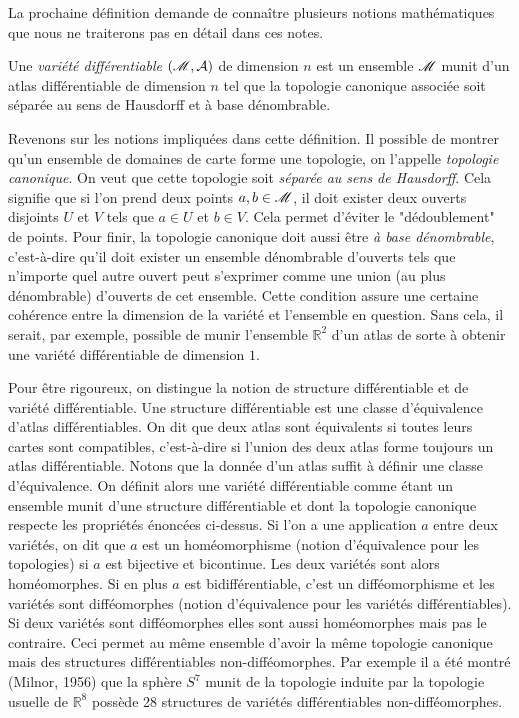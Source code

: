 \documentclass[a4paper,11pt]{report}
\begin{document}
            La prochaine définition demande de connaître plusieurs notions mathématiques que nous ne traiterons pas en détail dans ces notes.
            
            \begin{defn}
                Une \textit{variété différentiable} $(\mathscr{M},\mathcal{A})$ de dimension $n$ est un ensemble $\mathscr{M}$ munit d'un atlas différentiable de dimension $n$ tel que la topologie canonique associée soit séparée au sens de Hausdorff et à base dénombrable.
            \end{defn}
            
            Revenons sur les notions impliquées dans cette définition. Il possible de montrer qu'un ensemble de domaines de carte forme une topologie, on l'appelle \textit{topologie canonique}. On veut que cette topologie soit \textit{séparée au sens de Hausdorff}. Cela signifie que si l'on prend deux points $a, b \in \mathscr{M}$, il doit exister deux ouverts disjoints $U$ et $V$ tels que $a \in U$ et $b \in V$. Cela permet d'éviter le "dédoublement" de points. Pour finir, la topologie canonique doit aussi être \textit{à base dénombrable}, c'est-à-dire qu'il doit exister un ensemble dénombrable d'ouverts tels que n'importe quel autre ouvert peut s'exprimer comme une union (au plus dénombrable) d'ouverts de cet ensemble. Cette condition assure une certaine cohérence entre la dimension de la variété et l'ensemble en question. Sans cela, il serait, par exemple, possible de munir l'ensemble $\mathbb{R}^2$ d'un atlas de sorte à obtenir une variété différentiable de dimension $1$.
            
            \begin{rmk}
                Pour être rigoureux, on distingue la notion de structure différentiable et de variété différentiable. Une structure différentiable est une classe d'équivalence d'atlas différentiables. On dit que deux atlas sont équivalents si toutes leurs cartes sont compatibles, c'est-à-dire si l'union des deux atlas forme toujours un atlas différentiable. Notons que la donnée d'un atlas suffit à définir une classe d'équivalence. On définit alors une variété différentiable comme étant un ensemble munit d'une structure différentiable et dont la topologie canonique respecte les propriétés énoncées ci-dessus. Si l'on a une application $a$ entre deux variétés, on dit que $a$ est un homéomorphisme (notion d'équivalence pour les topologies) si $a$ est bijective et bicontinue. Les deux variétés sont alors homéomorphes. Si en plus $a$ est bidifférentiable, c'est un difféomorphisme et les variétés sont difféomorphes (notion d'équivalence pour les variétés différentiables). Si deux variétés sont difféomorphes elles sont aussi homéomorphes mais pas le contraire. Ceci permet au même ensemble d'avoir la même topologie canonique mais des structures différentiables non-difféomorphes. Par exemple il a été montré (Milnor, 1956) que la sphère $S^7$ munit de la topologie induite par la topologie usuelle de $\mathbb{R}^8$ possède 28 structures de variétés différentiables non-difféomorphes.
            \end{rmk}
            
\end{document}
